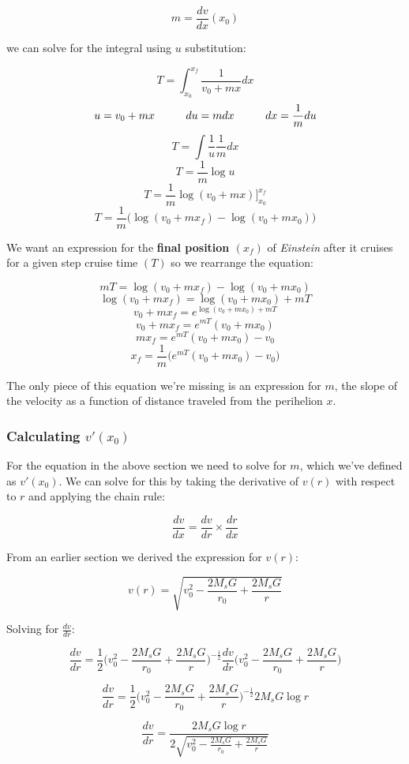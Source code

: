 \documentclass[12pt]{article} %
\begin{document}
$$m = \frac{dv}{dx}(x_0)$$

we can solve for the integral using $u$ substitution:

$$T = \int_{x_0}^{x_f} \frac{1}{v_0+mx} dx$$
$$u = v_0+mx\hspace{10mm}du = mdx\hspace{10mm}dx = \frac{1}{m}du$$
$$T = \int \frac{1}{u} \frac{1}{m}dx$$
$$T = \frac{1}{m} \log{u}$$
$$T = \frac{1}{m} \log{(v_0+mx)}\bigg]_{x_0}^{x_f}$$
$$T = \frac{1}{m} \bigg(\log{(v_0+mx_f)} - \log{(v_0+mx_0)}\bigg)$$

We want an expression for the \textbf{final position $(x_f)$} of \textit{Einstein} after it cruises for a given step cruise time  $(T)$ so we rearrange the equation:

$$mT = \log{(v_0+mx_f)} - \log{(v_0+mx_0)}$$
$$\log{(v_0+mx_f)} = \log{(v_0+mx_0)} + mT$$
$$v_0 + mx_f = e^{\log{(v_0+mx_0)}+mT}$$
$$v_0 + mx_f = e^{mT}(v_0+mx_0)$$
$$mx_f = e^{mT}(v_0+mx_0) - v_0$$
$$\boxed{x_f = \frac{1}{m}\bigg(e^{mT}(v_0+mx_0) - v_0\bigg)}$$

The only piece of this equation we're missing is an expression for $m$, the slope of the velocity as a function of distance traveled from the perihelion $x$. 

\subsubsection{Calculating $v'(x_0)$}

For the equation in the above section we need to solve for $m$, which we've defined as $v'(x_0)$. We can solve for this by taking the derivative of $v(r)$ with respect to $r$ and applying the chain rule:

$$\frac{dv}{dx} = \frac{dv}{dr}\times\frac{dr}{dx}$$

From an earlier section we derived the expression for $v(r)$:

$$v(r) = \sqrt{v_0^2-\frac{2M_sG}{r_0} + \frac{2M_sG}{r}}$$

Solving for $\frac{dv}{dr}$:

$$\frac{dv}{dr} = \frac{1}{2} \bigg(v_0^2-\frac{2M_sG}{r_0} + \frac{2M_sG}{r}\bigg)^{-\frac{1}{2}}\frac{dv}{dr}\bigg(v_0^2-\frac{2M_sG}{r_0} + \frac{2M_sG}{r}\bigg)$$

$$\frac{dv}{dr} = \frac{1}{2} \bigg(v_0^2-\frac{2M_sG}{r_0} + \frac{2M_sG}{r}\bigg)^{-\frac{1}{2}}2M_sG\log{r}$$

$$\frac{dv}{dr} = \frac{2M_sG \log{r}}{2 \sqrt{v_0^2-\frac{2M_sG}{r_0} + \frac{2M_sG}{r}}}$$
\end{document}
